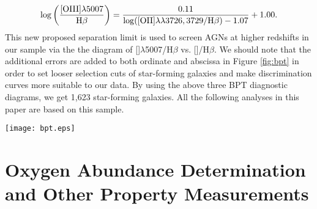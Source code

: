 \documentclass[twocolumn]{aastex631}
\newcommand{\Ha}{\mbox{H$\alpha$}}      %
\newcommand{\Hb}{\mbox{H$\beta$}}       %
\newcommand{\SII}{[\mbox{\ion{S}{2}}]}    %
\newcommand{\OIII}{[\mbox{\ion{O}{3}}]}   %
\newcommand{\NIIS}{[\mbox{\ion{N}{2}}]$\lambda$6583}
\newcommand{\OIIIFIZ}{[\mbox{\ion{O}{3}}]$\lambda$5007}
\newcommand{\OIIIFOT}{[\mbox{\ion{O}{3}}]$\lambda$4363}
\newcommand{\OII}{[\mbox{\ion{O}{2}}]}    %
\newcommand{\boldtext}[1]{\textcolor[rgb]{0,0,0}{#1}}
\begin{document}
\begin{equation}
{\rm \log\left(\frac{[OIII]\lambda5007}{H\beta}\right) = \frac{0.11}{\log([OII]\lambda\lambda3726,3729/H\beta)-1.07}+1.00}. \label{equ:bpt3}
\end{equation} 
This new proposed separation limit is used to screen AGNs at higher redshifts in our sample via the the diagram of {\OIIIFIZ/\Hb} vs. {\OII/\Hb}. \boldtext{We should note that the additional errors are added to both ordinate and abscissa in Figure \ref{fig:bpt} in order to set looser selection cuts of star-forming galaxies and make discrimination curves more suitable to our data.} By using the above three BPT diagnostic diagrams, we get 1,623 star-forming galaxies. All the following analyses in this paper are based on this sample.
\begin{figure*}[ht!]
\centering
\texttt{[image: bpt.eps]}
\caption{BPT diagnostic diagrams to discriminate star-forming galaxies (blue dots) from AGNs (red crosses). These galaxies shown are \OIIIFOT-detected. (a) The BPT diagram of {\OIIIFIZ/\Hb} vs. {\NIIS/\Ha}. The dashed line shows the empirical division between starbursts and AGNs obtained by \citet{Kau03}. (b) The BPT diagram of {\OIII/\Hb} vs. {\SII/\Ha}. The dashed show the theoretical division between starbursts and AGNs obtained by \citet{Kew01}. The solid lines in these two panels display the demarcation curves with an additional uncertainty of 0.1 dex. (c) The galaxy distribution on the plot of {\OIIIFIZ/\Hb} vs. {\OII/\Hb}. The dashed line presents the separation limit proposed by by \citet{Lam10}. The solid line displays the separation limit with the addition of an extra 0.15 dex uncertainty, which is used as our new proposed demarcation between starbursts and AGNs.  \label{fig:bpt}}
\end{figure*}




\section{Oxygen Abundance Determination and Other Property Measurements} \label{sec:measure}
\end{document}
